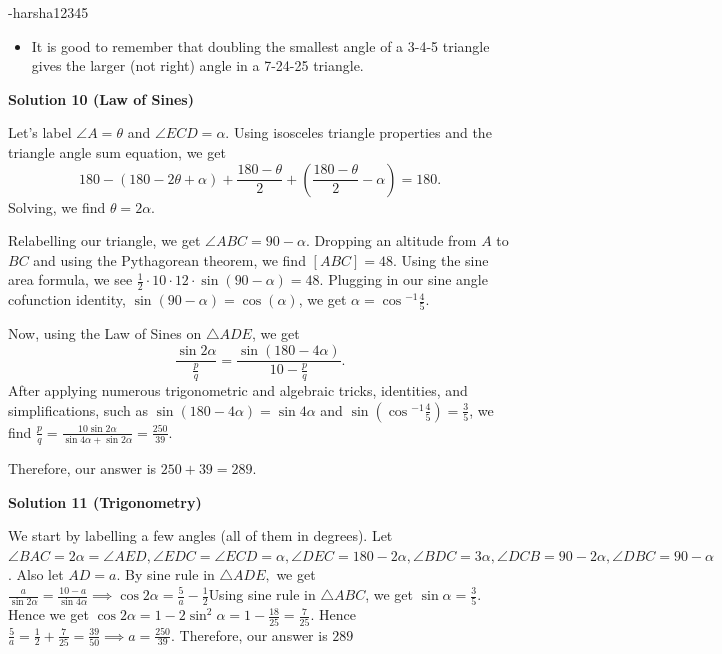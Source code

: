 \begin{enumerate}
 -harsha12345

 
            \begin{itemize}
        \item It is good to remember that doubling the smallest angle of a 3-4-5 triangle gives the larger (not right) angle in a 7-24-25 triangle.
            \end{itemize}
            



\textbf{Solution 10 (Law of Sines)}

Let's label $\angle A = \theta$ and $\angle ECD = \alpha$. Using isosceles triangle properties and the triangle angle sum equation, we get 
 \[180-(180-2\theta+\alpha) + \frac{180-\theta}{2} + \left(\frac{180-\theta}{2} - \alpha\right) = 180.\] Solving, we find $\theta = 2 \alpha$. 

 
Relabelling our triangle, we get $\angle ABC = 90 - \alpha$. Dropping an altitude from $A$ to $BC$ and using the Pythagorean theorem, we find $[ABC] = 48$. Using the sine area formula, we see $\frac12 \cdot 10 \cdot 12 \cdot \sin(90-\alpha) = 48$. Plugging in our sine angle cofunction identity, $\sin(90-\alpha) = \cos(\alpha)$, we get $\alpha = \cos{^{-1}}{\frac45}$. 

 
Now, using the Law of Sines on $\triangle ADE$, we get 
 \[\frac{\sin{2\alpha}}{\frac{p}{q}} = \frac{\sin{(180-4\alpha)}}{10-\frac{p}{q}}.\] After applying numerous trigonometric and algebraic tricks, identities, and simplifications, such as $\sin{(180-4\alpha)}=\sin{4\alpha}$ and $\sin{\left(\cos{^{-1}}{\frac45}\right)} = \frac35$, we find $\frac{p}{q} = \frac{10\sin{2\alpha}}{\sin{4\alpha}+\sin{2\alpha}} = \frac{250}{39}$. 

 


 Therefore, our answer is $250 + 39 = \boxed{289}$.

 



\textbf{Solution 11 (Trigonometry)}

We start by labelling a few angles (all of them in degrees). Let $\angle{BAC}=2\alpha = \angle{AED}, \angle{EDC}=\angle{ECD}=\alpha, \angle{DEC}=180-2\alpha, \angle{BDC}=3\alpha, \angle{DCB}=90-2\alpha, \angle{DBC}=90-\alpha$. Also let $AD=a$. By sine rule in $\triangle{ADE},$ we get $\frac{a}{\sin{2\alpha}}=\frac{10-a}{\sin{4\alpha}} \implies \cos{2\alpha}=\frac{5}{a}-\frac{1}{2}$Using sine rule in $\triangle{ABC}$, we get $\sin{\alpha}=\frac{3}{5}$. Hence we get $\cos{2\alpha}=1-2\sin^2{\alpha}=1-\frac{18}{25}=\frac{7}{25}$. Hence $\frac{5}{a}=\frac{1}{2}+\frac{7}{25}=\frac{39}{50} \implies a=\frac{250}{39}$. Therefore, our answer is $\boxed{289}$


\end{enumerate}
